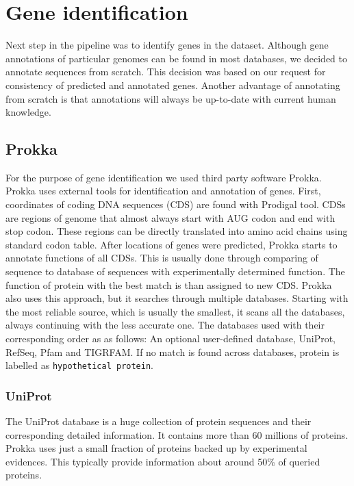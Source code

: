 \section{Gene identification}
Next step in the pipeline was to identify genes in the dataset.
Although gene annotations of particular genomes can be found in most databases, we decided to annotate sequences from scratch.
This decision was based on our request for consistency of predicted and annotated genes.
Another advantage of annotating from scratch is that annotations will always be up-to-date with current human knowledge.

\subsection{Prokka}
For the purpose of gene identification we used third party software Prokka\cite{prokka}.
Prokka uses external tools for identification and annotation of genes.
First, coordinates of coding DNA sequences (CDS) are found with Prodigal tool\cite{prodigal}.
CDSs are regions of genome that almost always start with AUG codon and end with stop codon.
These regions can be directly translated into amino acid chains using standard codon table.
After locations of genes were predicted, Prokka starts to annotate functions of all CDSs.
This is usually done through comparing of sequence to database of sequences with experimentally determined function.
The function of protein with the best match is than assigned to new CDS.
Prokka also uses this approach, but it searches through multiple databases.
Starting with the most reliable source, which is usually the smallest, it scans all the databases, always continuing with the less accurate one.
The databases used with their corresponding order as as follows:
An optional user-defined database, UniProt\cite{uniprot}, RefSeq\cite{refseq}, Pfam\cite{pfam} and TIGRFAM\cite{tigrfam}.
If no match is found across databases, protein is labelled as \verb|hypothetical protein|. 


\subsubsection{UniProt}
The UniProt database is a huge collection of protein sequences and their corresponding detailed information.
It contains more than 60 millions of proteins.
Prokka uses just a small fraction of proteins backed up by experimental evidences.
This typically provide information about around 50\% of queried proteins.

